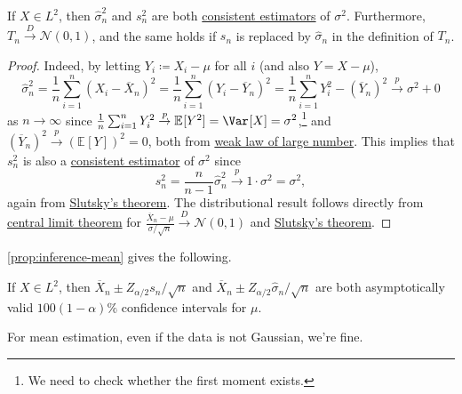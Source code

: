 \begin{proposition}\label{prop:inference-mean}
	If \(X \in L^2\), then \(\hat{\sigma} _n^2\) and \(s_n^2\) are both \hyperref[def:consistent]{consistent estimators} of \(\sigma ^2\). Furthermore, \(T_n \overset{D}{\to} \mathcal{N} (0, 1)\), and the same holds if \(s_n\) is replaced by \(\hat{\sigma} _n\) in the definition of \(T_n\).
\end{proposition}
\begin{proof}
	Indeed, by letting \(Y_i \coloneqq X_i - \mu \) for all \(i\) (and also \(Y = X - \mu \)),
	\[
		\hat{\sigma} _n^2
		= \frac{1}{n} \sum_{i=1}^{n} \left( X_i - \overline{X} _n\right) ^2
		= \frac{1}{n} \sum_{i=1}^{n} \left( Y_i - \overline{Y} _n\right) ^2
		= \frac{1}{n} \sum_{i=1}^{n} Y_i^2 - (\overline{Y} _n)^2
		\overset{p}{\to} \sigma ^2 + 0
	\]
	as \(n \to \infty \) since \(\frac{1}{n} \sum_{i=1}^{n} Y_i^2 \overset{p}{\to } \mathbb{E}_{}[Y^2] = \Var_{}[X] = \sigma ^2\),\footnote{We need to check whether the first moment exists.} and \((\overline{Y} _n)^2 \overset{p}{\to } (\mathbb{E}_{}[Y])^2 = 0\), both from \hyperref[thm:WLLN]{weak law of large number}. This implies that \(s_n^2\) is also a \hyperref[def:consistent]{consistent estimator} of \(\sigma ^2\) since
	\[
		s_n^2 = \frac{n}{n-1} \hat{\sigma} _n^2 \overset{p}{\to} 1 \cdot \sigma ^2 = \sigma ^2,
	\]
	again from \hyperref[col:Slutsky]{Slutsky's theorem}. The distributional result follows directly from \hyperref[thm:CLT]{central limit theorem} for \(\frac{\overline{X} _n - \mu }{\sigma / \sqrt{n} } \overset{D}{\to} \mathcal{N} (0, 1)\) and \hyperref[col:Slutsky]{Slutsky's theorem}.
\end{proof}

\autoref{prop:inference-mean} gives the following.

\begin{corollary}\label{col:inference-mean-CI}
	If \(X \in L^2\), then \(\overline{X} _n \pm Z_{\alpha / 2} s_n / \sqrt{n} \) and \(\overline{X} _n \pm Z_{\alpha / 2} \hat{\sigma} _n / \sqrt{n} \) are both asymptotically valid \(100 (1 - \alpha )\%\) confidence intervals for \(\mu \).
\end{corollary}

\begin{remark}
	For mean estimation, even if the data is not Gaussian, we're fine.
\end{remark}

